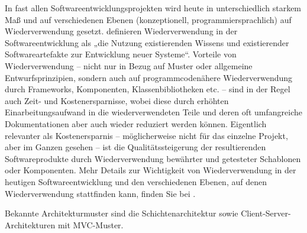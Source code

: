 In fast allen Softwareentwicklungsprojekten wird heute in unterschiedlich starkem Maß und auf verschiedenen Ebenen (konzeptionell, programmiersprachlich) auf 
\linebreak %
Wieder\-verwendung  gesetzt. \cite[341]{bro21} definieren Wiederverwendung in der 
\linebreak %
Software\-entwicklung als „die Nutzung existierenden Wissens und existierender 
\linebreak %
Software\-artefakte zur Entwicklung neuer Systeme“. Vorteile von Wiederverwendung -- nicht nur in Bezug auf Muster oder allgemeine Entwurfsprinzipien, sondern auch auf programm\-code\-nähere Wiederverwendung durch Frameworks, Komponenten, 
\linebreak %
Klassen\-bibliotheken etc. --  sind in der Regel auch Zeit- und Kostenersparnisse, wobei diese durch erhöhten Einarbeitungsaufwand in die wiederverwendeten Teile und deren oft umfangreiche Dokumentationen aber auch wieder reduziert werden können. Eigentlich relevanter als Kostenersparnis -- möglicherweise nicht für das einzelne Projekt, aber im Ganzen gesehen -- ist die Qualitätssteigerung der resultierenden Softwareprodukte durch Wiederverwendung bewährter und getesteter Schablonen oder Komponenten. Mehr Details zur Wichtigkeit von Wiederverwendung in der heutigen Softwareentwicklung und den verschiedenen Ebenen, auf denen Wiederverwendung stattfinden kann, finden Sie bei \cite[341-346]{bro21}.

Bekannte Architekturmuster sind die Schichtenarchitektur sowie Client-Server-
\linebreak %
Architekturen mit MVC-Muster.